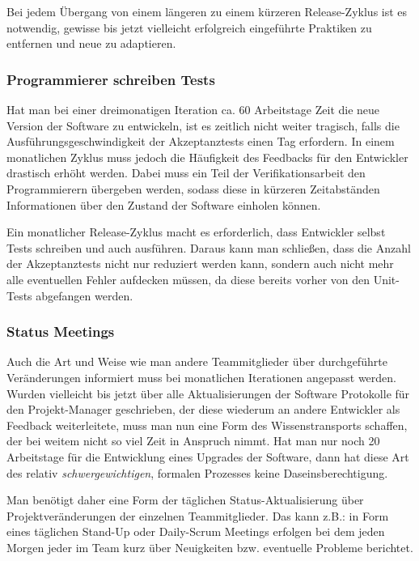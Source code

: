 Bei jedem Übergang von einem längeren zu einem kürzeren Release-Zyklus ist es
notwendig, gewisse bis jetzt vielleicht erfolgreich eingeführte Praktiken zu
entfernen und neue zu adaptieren.

\subsubsection{Programmierer schreiben Tests}
\label{minisec:programmierer-schreiben-tests}
Hat man bei einer dreimonatigen Iteration ca. 60 Arbeitstage Zeit die neue
Version der Software zu entwickeln, ist es zeitlich nicht weiter tragisch,
falls die Ausführungsgeschwindigkeit der Akzeptanztests einen Tag erfordern.
In einem monatlichen Zyklus muss jedoch die Häufigkeit des Feedbacks für den
Entwickler drastisch erhöht werden. Dabei muss ein Teil der
Verifikationsarbeit den Programmierern übergeben werden, sodass diese in
kürzeren Zeitabständen Informationen über den Zustand der Software einholen
können.

Ein monatlicher Release-Zyklus macht es erforderlich, dass Entwickler selbst
Tests schreiben und auch ausführen. Daraus kann man schließen, dass die Anzahl
der Akzeptanztests nicht nur reduziert werden kann, sondern auch nicht mehr
alle eventuellen Fehler aufdecken müssen, da diese bereits vorher von den
Unit-Tests abgefangen werden.

\subsubsection{Status Meetings}
\label{minisec:status-meetings}

Auch die Art und Weise wie man andere Teammitglieder über durchgeführte
Veränderungen informiert muss bei monatlichen Iterationen angepasst werden.
Wurden vielleicht bis jetzt über alle Aktualisierungen der Software Protokolle
für den Projekt-Manager geschrieben, der diese wiederum an andere Entwickler
als Feedback weiterleitete, muss man nun eine Form des Wissenstransports
schaffen, der bei weitem nicht so viel Zeit in Anspruch nimmt. Hat man nur
noch 20 Arbeitstage für die Entwicklung eines Upgrades der Software, dann hat
diese Art des relativ \emph{schwergewichtigen}, formalen Prozesses keine
Daseinsberechtigung.

Man benötigt daher eine Form der täglichen Status-Aktualisierung über
Projektveränderungen der einzelnen Teammitglieder. Das kann z.B.: in Form
eines täglichen Stand-Up oder Daily-Scrum Meetings erfolgen bei dem jeden
Morgen jeder im Team kurz über Neuigkeiten bzw. eventuelle Probleme berichtet.

